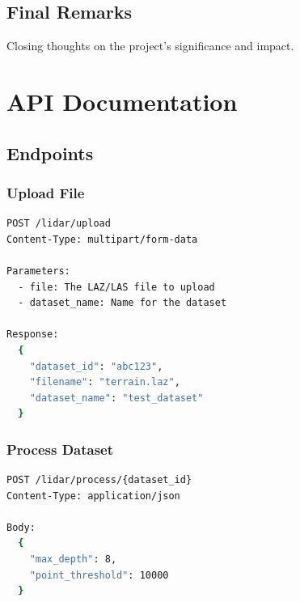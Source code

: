 \documentclass[12pt,a4paper,onecolumn,oneside]{report}
\begin{document}
\section{Final Remarks}
\label{sec:conclusion:remarks}

Closing thoughts on the project's significance and impact.


\clearpage

\printbibliography[title={Bibliography and References}]


\appendix

\chapter{API Documentation}
\label{app:api}

\section{Endpoints}
\label{sec:app:endpoints}

\subsection{Upload File}

\begin{lstlisting}[language=bash]
POST /lidar/upload
Content-Type: multipart/form-data

Parameters:
  - file: The LAZ/LAS file to upload
  - dataset_name: Name for the dataset

Response:
  {
    "dataset_id": "abc123",
    "filename": "terrain.laz",
    "dataset_name": "test_dataset"
  }
\end{lstlisting}

\subsection{Process Dataset}

\begin{lstlisting}[language=bash]
POST /lidar/process/{dataset_id}
Content-Type: application/json

Body:
  {
    "max_depth": 8,
    "point_threshold": 10000
  }
\end{lstlisting}
\end{document}
